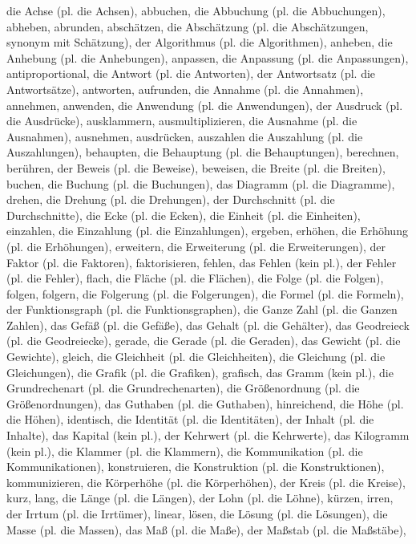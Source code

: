 die Achse (pl. die Achsen),
abbuchen,
die Abbuchung (pl. die Abbuchungen),
abheben,
abrunden,
abschätzen,
die Abschätzung (pl. die Abschätzungen, synonym mit Schätzung),
der Algorithmus (pl. die Algorithmen),
anheben,
die Anhebung (pl. die Anhebungen),
anpassen,
die Anpassung (pl. die Anpassungen),
antiproportional,
die Antwort (pl. die Antworten),
der Antwortsatz (pl. die Antwortsätze),
antworten,
aufrunden,
die Annahme (pl. die Annahmen),
annehmen,
anwenden,
die Anwendung (pl. die Anwendungen),
der Ausdruck (pl. die Ausdrücke),
ausklammern,
ausmultiplizieren,
die Ausnahme (pl. die Ausnahmen),
ausnehmen,
ausdrücken,
auszahlen
die Auszahlung (pl. die Auszahlungen),
behaupten,
die Behauptung (pl. die Behauptungen),
berechnen,
berühren,
der Beweis (pl. die Beweise),
beweisen,
die Breite (pl. die Breiten),
buchen,
die Buchung (pl. die Buchungen),
das Diagramm (pl. die Diagramme),
drehen,
die Drehung (pl. die Drehungen),
der Durchschnitt (pl. die Durchschnitte),
die Ecke (pl. die Ecken),
die Einheit (pl. die Einheiten),
einzahlen,
die Einzahlung (pl. die Einzahlungen),
ergeben,
erhöhen,
die Erhöhung (pl. die Erhöhungen),
erweitern,
die Erweiterung (pl. die Erweiterungen),
der Faktor (pl. die Faktoren),
faktorisieren,
fehlen,
das Fehlen (kein pl.),
der Fehler (pl. die Fehler),
flach,
die Fläche (pl. die Flächen),
die Folge (pl. die Folgen),
folgen,
folgern,
die Folgerung (pl. die Folgerungen),
die Formel (pl. die Formeln),
der Funktionsgraph (pl. die Funktionsgraphen),
die Ganze Zahl (pl. die Ganzen Zahlen),
das Gefäß (pl. die Gefäße),
das Gehalt (pl. die Gehälter),
das Geodreieck (pl. die Geodreiecke),
gerade,
die Gerade (pl. die Geraden),
das Gewicht (pl. die Gewichte),
gleich,
die Gleichheit (pl. die Gleichheiten),
die Gleichung (pl. die Gleichungen),
die Grafik (pl. die Grafiken),
grafisch,
das Gramm (kein pl.),
die Grundrechenart (pl. die Grundrechenarten),
die Größenordnung (pl. die Größenordnungen),
das Guthaben (pl. die Guthaben),
hinreichend,
die Höhe (pl. die Höhen),
identisch,
die Identität (pl. die Identitäten),
der Inhalt (pl. die Inhalte),
das Kapital (kein pl.),
der Kehrwert (pl. die Kehrwerte),
das Kilogramm (kein pl.),
die Klammer (pl. die Klammern),
die Kommunikation (pl. die Kommunikationen),
konstruieren,
die Konstruktion (pl. die Konstruktionen),
kommunizieren,
die Körperhöhe (pl. die Körperhöhen),
der Kreis (pl. die Kreise),
kurz,
lang,
die Länge (pl. die Längen),
der Lohn (pl. die Löhne),
kürzen,
irren,
der Irrtum (pl. die Irrtümer),
linear,
lösen,
die Lösung (pl. die Lösungen),
die Masse (pl. die Massen),
das Maß (pl. die Maße),
der Maßstab (pl. die Maßstäbe),
